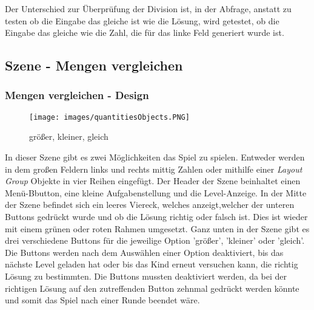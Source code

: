 Der Unterschied zur Überprüfung der Division ist, in der Abfrage, anstatt zu testen ob die Eingabe das gleiche ist wie die Lösung, wird getestet, ob die Eingabe das gleiche wie die Zahl, die für das linke Feld generiert wurde ist.
\subsection{Szene - Mengen vergleichen}
\subsubsection{Mengen vergleichen - Design}
\begin{figure}[htbp]
  \centering
  \texttt{[image: images/quantitiesObjects.PNG]}
  \caption{größer, kleiner, gleich}
  \label{quantities}
\end{figure}
In dieser Szene gibt es zwei Möglichkeiten das Spiel zu spielen. Entweder werden in dem großen Feldern links und rechts mittig Zahlen oder mithilfe einer \textit{Layout Group} Objekte in vier Reihen eingefügt. Der Header der Szene beinhaltet einen Menü-Bbutton, eine kleine Aufgabenstellung und die Level-Anzeige. In der Mitte der Szene befindet sich ein leeres Viereck, welches anzeigt,welcher der unteren Buttons gedrückt wurde und ob die Lösung richtig oder falsch ist. Dies ist wieder mit einem grünen oder roten Rahmen umgesetzt. Ganz unten in der Szene gibt es drei verschiedene Buttons für die jeweilige Option 'größer', 'kleiner' oder 'gleich'. Die Buttons werden nach dem Auswählen einer Option deaktiviert, bis das nächste Level geladen hat oder bis das Kind erneut versuchen kann, die richtig Lösung zu bestimmten. Die Buttons mussten deaktiviert werden, da bei der richtigen Lösung auf den zutreffenden Button zehnmal gedrückt werden könnte und somit das Spiel nach einer Runde beendet wäre.\\
